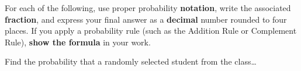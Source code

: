 \documentclass[noanswers]{exam}
\begin{document}
\begin{questions}
For each of the following, use proper probability \textbf{notation}, write the associated \textbf{fraction}, and express your final answer as a \textbf{decimal} number rounded to four places. If you apply a probability rule (such as the Addition Rule or Complement Rule), \textbf{show the formula} in your work. 

\vspace{3mm}

Find the probability that a randomly selected student from the class\dots 

\end{questions}
\end{document}
